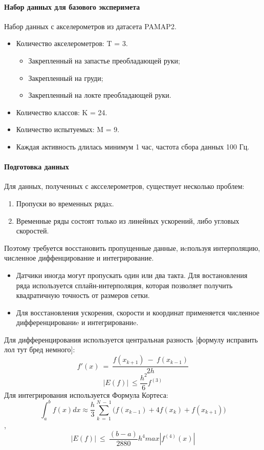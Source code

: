 \documentclass[12pt, twoside]{article}
\begin{document}
\paragraph{Набор данных для базового эксперимета}
Набор данных с акселерометров из датасета PAMAP2.
\begin{itemize}
        \item Количество акселерометров: T = 3.
        \begin{itemize}
            \item Закрепленный на запастье преобладающей руки;
            \item Закрепленный на груди;
            \item Закрепленный на локте преобладающей руки.
        \end{itemize}
        \item Количество классов: K = 24.
        \item Количество испытуемых: M = 9.
        \item Каждая активность длилась минимум 1 час, частота сбора данных 100 Гц.
    \end{itemize}

\paragraph{Подготовка данных}
Для данных, полученных с аксселерометров, существует несколько проблем:
\begin{enumerate}
        \item Пропуски во временных рядаx.
        \item Временные ряды состоят только из линейных ускорений, либо угловых скоростей.
\end{enumerate}

Поэтому требуется восстановить пропущенные данные, иcпользуя интерполяцию, численное диффенцирование и интегрирование.

\begin{itemize}
        \item Датчики иногда могут пропускать один или два такта. Для востановления ряда используется сплайн-интерполяция, которая позволяет получить квадратичную точность от размеров сетки.
        \item Для восстановления ускорения, скорости и координат применяется численное дифференцированиe и интегрированиe.
\end{itemize}

Для дифференцирования используется центральная разность [формулу исправить лол тут бред немного]:
\[f'(x)\ =\ \frac{f(x_{k+1})\ -\ f(x_{k-1})}{2h}\]
\[\left|E(f)\right|\ \le \frac{h^2}{6}f^{(3)}\]
Для интегрирования используется Формула Кортеса:
    \[\int_{a}^{b}{f(x)dx}\approx\frac{h}{3}\sum_{k\ =\ 1}^{N\ -\ 1}{\Big(f(x_{k-1})+4f(x_k)+f(x_{k+1})\Big)}\],  
    \[\left|E(f)\right|\ \le\ \frac{(b-a)}{2880}h^4max\left|f^{(4)}\left(x\right)\right|\]
\end{document}
